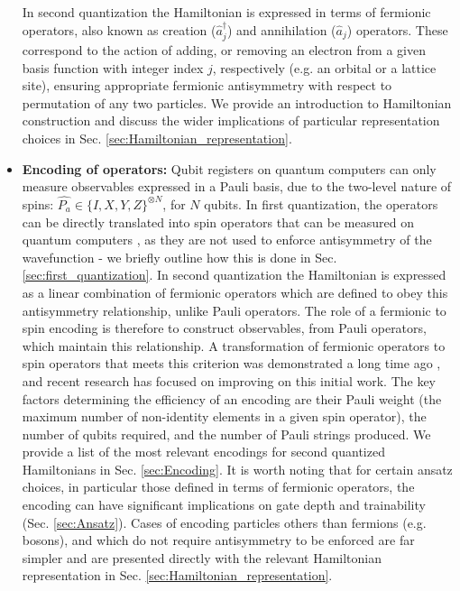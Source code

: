 \begin{itemize}
    In second quantization the Hamiltonian is expressed in terms of fermionic operators, also known as creation ($\hat{a}^{\dagger}_j$) and annihilation ($\hat{a}_j$) operators. These correspond to the action of adding, or removing an electron from a given basis function with integer index $j$, respectively (e.g. an orbital or a lattice site), ensuring appropriate fermionic antisymmetry with respect to permutation of any two particles. We provide an introduction to Hamiltonian construction and discuss the wider implications of particular representation choices in Sec. \ref{sec:Hamiltonian_representation}.
    \item \textbf{Encoding of operators:} Qubit registers on quantum computers can only measure observables expressed in a Pauli basis, due to the two-level nature of spins: $\hat{P_{a}} \in \{I, X, Y, Z\}^{\otimes N}$, for $N$ qubits. In first quantization, the operators can be directly translated into spin operators that can be measured on quantum computers \cite{mcardleQuantumComputationalChemistry2018}, as they are not used to enforce antisymmetry of the wavefunction - we briefly outline how this is done in Sec. \ref{sec:first_quantization}. In second quantization the Hamiltonian is expressed as a linear combination of fermionic operators which are defined to obey this antisymmetry relationship, unlike Pauli operators. The role of a fermionic to spin encoding is therefore to construct observables, from Pauli operators, which maintain this relationship. A transformation of fermionic operators to spin operators that meets this criterion was demonstrated a long time ago \cite{Jordan1928}, and recent research has focused on improving on this initial work. The key factors determining the efficiency of an encoding are their Pauli weight (the maximum number of non-identity elements in a given spin operator), the number of qubits required, and the number of Pauli strings produced. We provide a list of the most relevant encodings for second quantized Hamiltonians in Sec. \ref{sec:Encoding}. It is worth noting that for certain ansatz choices, in particular those defined in terms of fermionic operators, the encoding can have significant implications on gate depth and trainability (Sec. \ref{sec:Ansatz}). Cases of encoding particles others than fermions (e.g. bosons), and which do not require antisymmetry to be enforced are far simpler and are presented directly with the relevant Hamiltonian representation in Sec. \ref{sec:Hamiltonian_representation}. 

\end{itemize}
